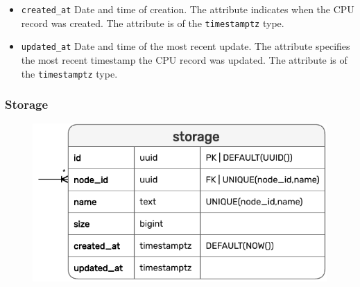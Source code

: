 \begin{itemize}
  \item \texttt{created\_at}
    \newline
    Date and time of creation.
    \newline
    The attribute indicates when the CPU record was created.
    \newline
    The attribute is of the \texttt{timestamptz} type.

  \item \texttt{updated\_at}
    \newline
    Date and time of the most recent update.
    \newline
    The attribute specifies the most recent timestamp the CPU record was updated.
    \newline
    The attribute is of the \texttt{timestamptz} type.
\end{itemize}

\subsubsection{Storage}
\label{subsubsec:implementation_server_database_storage}

\begin{figure}[htbp]
  \centering
  \includegraphics[width=.75\textwidth]{images/implementation/erm_storage.pdf}
\end{figure}

